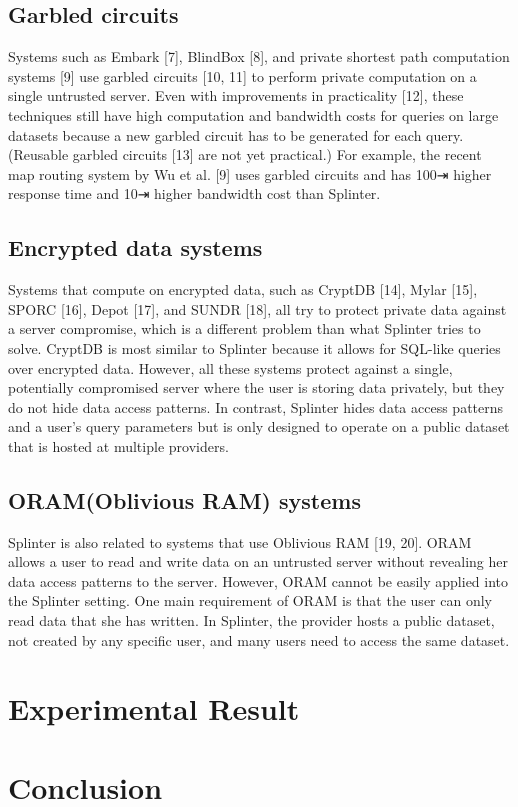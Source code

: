 \documentclass[12pt,a4paper]{article}
\begin{document}
\begin{multicols}{2}
\subsection{Garbled circuits}
Systems such as Embark [7], BlindBox [8], and 
private shortest path computation systems [9] 
use garbled circuits [10, 11] to perform private 
computation on a single untrusted server. Even with 
improvements in practicality [12], these techniques 
still have high computation and bandwidth costs for 
queries on large datasets because a new garbled 
circuit has to be generated for each query. 
(Reusable garbled circuits [13] are not yet 
practical.) For example, the recent map routing 
system by Wu et al. [9] uses garbled circuits and 
has 100⇥ higher response time and 10⇥ higher
bandwidth cost than Splinter.
\subsection{Encrypted data systems}
Systems that compute on encrypted data, such as CryptDB [14], Mylar [15], SPORC [16], Depot [17], and SUNDR [18], all try to protect private data against a server compromise, which is a different problem than what Splinter tries to solve. CryptDB is most similar to Splinter because it allows for SQL-like queries over encrypted data. However, all these systems protect against a single, potentially compromised server where the user is storing data privately, but they do not hide data access patterns. In contrast, Splinter hides data access patterns and a user’s query parameters but is only designed to operate on a public dataset that is hosted at multiple providers.
\subsection{ORAM(Oblivious RAM) systems}
Splinter is also related to systems that use Oblivious RAM [19, 20]. ORAM allows a user to read and write data on an untrusted server without revealing her data access patterns to the server. However, ORAM cannot be easily applied into the Splinter setting. One main requirement of ORAM is that the user can only read data that she has written. In Splinter, the provider hosts a public dataset, not created by any specific user, and many users need to access the same dataset.
\section{Experimental Result}
\section{Conclusion}


\end{multicols}
\end{document}

